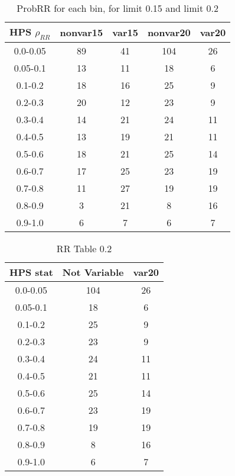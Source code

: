 \documentclass[aps,prb,twocolumn,superscriptaddress]{revtex4-1}
\begin{document}
	\begin{table}[H]
		\begin{center}
			\begin{tabular}{|c|c|c|c|c|}\hline
				HPS $\rho_{RR}$	&	nonvar15	&	var15	&	nonvar20	&	var20 \\ \hline
				0.0-0.05 	&	89 			&	41 		&	104 		&	26 \\ \hline
				0.05-0.1 	&	13 			&	11 		&	18 			&	6 \\ \hline
				0.1-0.2 	&	18 			&	16 		&	25 			&	9 \\ \hline
				0.2-0.3 	&	20 			&	12 		&	23 			&	9 \\ \hline
				0.3-0.4 	&	14 			&	21 		&	24 			&	11 \\ \hline
				0.4-0.5 	&	13 			&	19 		&	21 			&	11 \\ \hline
				0.5-0.6 	&	18 			&	21 		&	25 			&	14 \\ \hline
				0.6-0.7 	&	17 			&	25 		&	23 			&	19 \\ \hline
				0.7-0.8 	&	11 			&	27 		&	19 			&	19 \\ \hline
				0.8-0.9 	&	3 			&	21 		&	8 			&	16 \\ \hline
				0.9-1.0 	&	6 			&	7 		&	6 			&	7 \\ \hline
			\end{tabular}
		\end{center}
	  \caption{ \small{ProbRR for each bin, for limit 0.15 and limit 0.2\label{tab:probbRRbin}}}
	\end{table}	

	\begin{table}[H]
		\begin{center}
			\begin{tabular}{|c|c|c|}\hline
			HPS stat & Not Variable & var20 \\ \hline
			0.0-0.05 & 104 & 26 \\ \hline
			0.05-0.1 & 18 & 6 \\ \hline
			0.1-0.2 & 25 & 9 \\ \hline
			0.2-0.3 & 23 & 9 \\ \hline
			0.3-0.4 & 24 & 11 \\ \hline
			0.4-0.5 & 21 & 11 \\ \hline
			0.5-0.6 & 25 & 14 \\ \hline
			0.6-0.7 & 23 & 19 \\ \hline
			0.7-0.8 & 19 & 19 \\ \hline
			0.8-0.9 & 8 & 16 \\ \hline
			0.9-1.0 & 6 & 7 \\ \hline
			\end{tabular}
		\end{center}
	\caption{ \small{RR Table 0.2 \label{tab:HPSlim20}}}
	\end{table}
\end{document}
